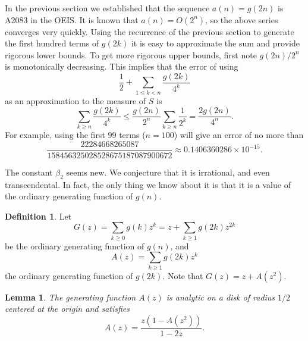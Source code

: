 \documentclass[12pt]{amsart}
\newtheorem{lemma}{Lemma}
\theoremstyle{definition}
\newtheorem{definition}{Definition}
\begin{document}
In the previous section we established that the sequence $a(n) = g(2n)$ is
A2083 in the OEIS. It is known that $a(n) = O(2^n)$, so the above series
converges very quickly. Using the recurrence of the previous section to
generate the first hundred terms of $g(2k)$ it is easy to approximate the sum
and provide rigorous lower bounds. To get more rigorous upper bounds, first
note $g(2n) / 2^n$ is monotonically decreasing. This implies that the error of
using
\begin{equation*}
    \frac{1}{2} + \sum_{1 \leq k < n} \frac{g(2k)}{4^k}
\end{equation*}
as an approximation to the measure of $S$ is
\begin{equation*}
    \sum_{k \geq n} \frac{g(2k)}{4^k}
        \leq \frac{g(2n)}{2^n} \sum_{k \geq n} \frac{1}{2^k}
        = \frac{2g(2n)}{4^n}.
\end{equation*}
For example, using the first $99$ terms ($n = 100$) will give an error of no
more than
\begin{equation*}
    \frac{22284668265087}{158456325028528675187087900672}
    \approx 0.1406360286 \times 10^{-15}.
\end{equation*}

The constant $\beta_2$ seems new. We conjecture that it is irrational, and even
transcendental. In fact, the only thing we know about it is that it is a value
of the ordinary generating function of $g(n)$.

\begin{definition}
    Let
    \begin{equation*}
        G(z) = \sum_{k \geq 0} g(k) z^k = z + \sum_{k \geq 1} g(2k) z^{2k}
    \end{equation*}
    be the ordinary generating function of $g(n)$, and
    \begin{equation*}
        A(z) = \sum_{k \geq 1} g(2k) z^k
    \end{equation*}
    the ordinary generating function of $g(2k)$. Note that $G(z) = z + A(z^2)$.
\end{definition}

\begin{lemma}
    The generating function $A(z)$ is analytic on a disk of radius $1 / 2$
    centered at the origin and satisfies
    \begin{equation*}
        A(z) = \frac{z(1 - A(z^2))}{1 - 2z}.
    \end{equation*}
\end{lemma}
\end{document}
